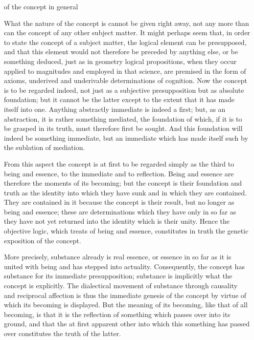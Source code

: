 
of the concept in general

What the nature of the concept is cannot be given right away,
not any more than can the concept of any other subject matter.
It might perhaps seem that, in order to state the concept of a subject matter,
the logical element can be presupposed, and that this element would not
therefore be preceded by anything else, or be something deduced,
just as in geometry logical propositions, when they occur applied to
magnitudes and employed in that science, are premised in the form of axioms,
underived and underivable determinations of cognition.
Now the concept is to be regarded indeed, not just as
a subjective presupposition but as absolute foundation;
but it cannot be the latter except to the extent that
it has made itself into one.
Anything abstractly immediate is indeed a first;
but, as an abstraction, it is rather something mediated, the foundation of which,
if it is to be grasped in its truth, must therefore first be sought.
And this foundation will indeed be something immediate,
but an immediate which has made itself such by the sublation of mediation.

From this aspect the concept is at first to be regarded simply
as the third to being and essence, to the immediate and to reflection.
Being and essence are therefore the moments of its becoming;
but the concept is their foundation and truth as the identity
into which they have sunk and in which they are contained.
They are contained in it because the concept is their result,
but no longer as being and essence;
these are determinations which they have only in so far as
they have not yet returned into the identity which is their unity.
Hence the objective logic, which treats of being and essence,
constitutes in truth the genetic exposition of the concept.

More precisely, substance already is real essence, or
essence in so far as it is united with being and has stepped
into actuality.
Consequently, the concept has substance for its immediate
presupposition; substance is implicitly what the concept is explicitly. The
dialectical movement of substance through causality and reciprocal affection
is thus the immediate genesis of the concept by virtue of which its becoming
is displayed.
But the meaning of its becoming, like that of all becoming, is
that it is the reflection of something which passes over into its ground, and
that the at first apparent other into which this something has passed over
constitutes the truth of the latter.

